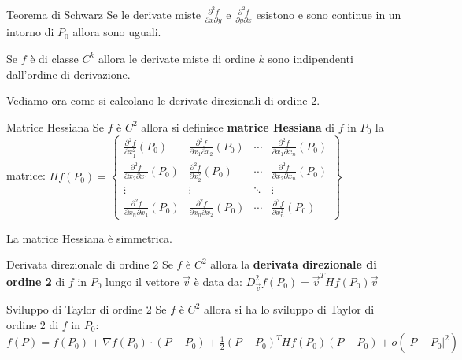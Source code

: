 \begin{teorema}{Teorema di Schwarz}
  Se le derivate miste $\frac{\partial^2 f}{\partial x \partial y}$ e $\frac{\partial^2 f}{\partial y \partial x}$ esistono e sono continue in un intorno di $P_0$ allora sono uguali.
\end{teorema}

\begin{corollario}{}
  Se $f$ è di classe $C^k$ allora le derivate miste di ordine $k$ sono indipendenti dall'ordine di derivazione.
\end{corollario}

Vediamo ora come si calcolano le derivate direzionali di ordine 2.
\begin{definizione}{Matrice Hessiana}
  Se $f$ è $C^2$ allora si definisce \textbf{matrice Hessiana} di $f$ in $P_0$ la matrice:
  $Hf(P_0)=\begin{Bmatrix}
    \frac{\partial^2 f}{\partial x_1^2}(P_0) & \frac{\partial^2 f}{\partial x_1 \partial x_2}(P_0) & \cdots & \frac{\partial^2 f}{\partial x_1 \partial x_n}(P_0)\\
    \frac{\partial^2 f}{\partial x_2 \partial x_1}(P_0) & \frac{\partial^2 f}{\partial x_2^2}(P_0) & \cdots & \frac{\partial^2 f}{\partial x_2 \partial x_n}(P_0)\\
    \vdots & \vdots & \ddots & \vdots\\
    \frac{\partial^2 f}{\partial x_n \partial x_1}(P_0) & \frac{\partial^2 f}{\partial x_n \partial x_2}(P_0) & \cdots & \frac{\partial^2 f}{\partial x_n^2}(P_0)
  \end{Bmatrix}$
\end{definizione}
\begin{osservazione}{}
  La matrice Hessiana è simmetrica.
\end{osservazione}

\begin{definizione}{Derivata direzionale di ordine 2}
  Se $f$ è $C^2$ allora la \textbf{derivata direzionale di ordine 2} di $f$ in $P_0$ lungo il vettore $\vec v$ è data da:
  $D^2_{\vec v}f(P_0)=\vec v^T Hf(P_0) \vec v$
\end{definizione}

\begin{teorema}{Sviluppo di Taylor di ordine 2}
  Se $f$ è $C^2$ allora si ha lo sviluppo di Taylor di ordine 2 di $f$ in $P_0$:
  $f(P) = f(P_0) + \nabla f(P_0) \cdot (P - P_0) + \frac{1}{2} (P - P_0)^T Hf(P_0) (P - P_0) + o(|P - P_0|^2)$
\end{teorema}

